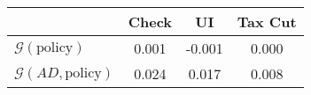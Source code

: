 \begin{tabular}{@{}lccc@{}} 
\toprule 
                          & Check      & UI    & Tax Cut    \\  \midrule 
$\mathcal{G}(\text{policy})$ & 0.001  & -0.001  & 0.000     \\ 
$\mathcal{G}(AD,\text{policy})$ & 0.024  & 0.017  & 0.008     \\ 
\end{tabular}  
